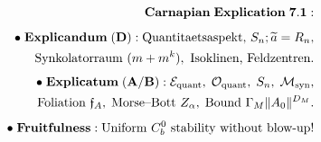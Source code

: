 \documentclass[preview]{standalone}
\begin{document}
\begin{align*}
\special{dvisvgm:raw <g id='unique000'>}\mathbf{Carnapian\;Explication\;7.1:}\\[5pt]\bullet\;\mathbf{Explicandum\;(D):}\;\text{Quantitaetsaspekt, }S_n;\widetilde{a}=R_n,\\\;\;\text{Synkolatorraum }(m+m^k),\text{ Isoklinen, Feldzentren.}\\[4pt]\bullet\;\mathbf{Explicatum\;(A/B):}\;\mathcal{E}_{\text{quant}},\;\mathcal{O}_{\text{quant}},\;S_n,\;\mathcal{M}_{\text{syn}},\\\;\;\text{Foliation }\mathfrak{f}_A,\;\text{Morse--Bott }Z_\alpha,\;\text{Bound }\Gamma_M\|A_0\|^{D_M}.\\[4pt]\bullet\;\mathbf{Fruitfulness:}\;\text{Uniform }C_b^0\text{ stability without blow-up!}\special{dvisvgm:raw </g>}
\end{align*}
\end{document}
